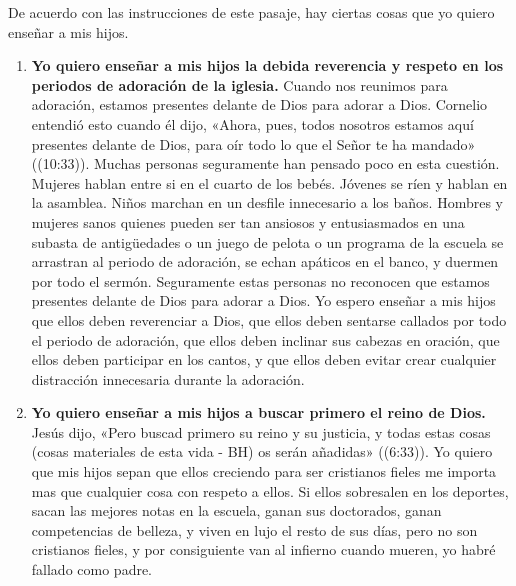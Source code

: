 \documentclass[12pt, twoside, openright]{book}
\begin{document}
De acuerdo con las instrucciones de este pasaje, hay ciertas cosas que yo quiero enseñar a mis hijos.
\begin{enumerate}
\item\textbf{Yo quiero enseñar a mis hijos la debida reverencia y respeto en los periodos de adoración de la iglesia.} Cuando nos reunimos para adoración, estamos presentes delante de Dios para adorar a Dios. Cornelio entendió esto cuando él dijo, «Ahora, pues, todos nosotros estamos aquí presentes delante de Dios, para oír todo lo que el Señor te ha mandado» ((10:33)). Muchas personas seguramente han pensado poco en esta cuestión. Mujeres hablan entre si en el cuarto de los bebés. Jóvenes se ríen y hablan en la asamblea. Niños marchan en un desfile innecesario a los baños. Hombres y mujeres sanos quienes pueden ser tan ansiosos y entusiasmados en una subasta de antigüedades o un juego de pelota o un programa de la escuela se arrastran al periodo de adoración, se echan apáticos en el banco, y duermen por todo el sermón. Seguramente estas personas no reconocen que estamos presentes {delante de Dios para adorar a Dios}. Yo espero enseñar a mis hijos que ellos deben reverenciar a Dios, que ellos deben sentarse callados por todo el periodo de adoración, que ellos deben inclinar sus cabezas en oración, que ellos deben participar en los cantos, y que ellos deben evitar crear cualquier distracción innecesaria durante la adoración.
\item\textbf{Yo quiero enseñar a mis hijos a buscar primero el reino de Dios.} Jesús dijo, «Pero buscad primero su reino y su justicia, y todas estas cosas (cosas materiales de esta vida - BH) os serán añadidas» ((6:33)). Yo quiero que mis hijos sepan que ellos creciendo para ser cristianos fieles me importa mas que cualquier cosa con respeto a ellos. Si ellos sobresalen en los deportes, sacan las mejores notas en la escuela, ganan sus doctorados, ganan competencias de belleza, y viven en lujo el resto de sus días, pero no son cristianos fieles, y por consiguiente van al infierno cuando mueren, yo habré fallado como padre. 


\end{enumerate}
\end{document}
